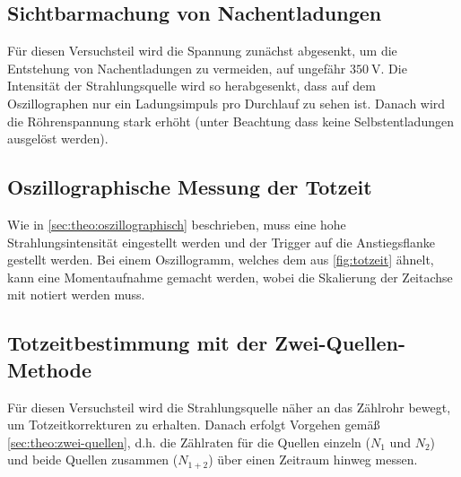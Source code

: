 \subsection{Sichtbarmachung von Nachentladungen}
\label{sec:duch:nachentladungen}

Für diesen Versuchsteil wird die Spannung zunächst abgesenkt, um die Entstehung von Nachentladungen zu vermeiden,
auf ungefähr $\SI{350}{\volt}$. Die Intensität der Strahlungsquelle wird so herabgesenkt, dass auf dem Oszillographen 
nur ein Ladungsimpuls pro Durchlauf zu sehen ist. Danach wird die Röhrenspannung stark erhöht (unter Beachtung dass
keine Selbstentladungen ausgelöst werden).

\subsection{Oszillographische Messung der Totzeit}
\label{sec:durch:oszill-totzeit}

Wie in \autoref{sec:theo:oszillographisch} beschrieben, muss eine hohe Strahlungsintensität eingestellt werden und der
Trigger auf die Anstiegsflanke gestellt werden. Bei einem Oszillogramm, welches dem aus \autoref{fig:totzeit} ähnelt,
kann eine Momentaufnahme gemacht werden, wobei die Skalierung der Zeitachse mit notiert werden muss.

\subsection{Totzeitbestimmung mit der Zwei-Quellen-Methode}
\label{sec:durch:zwei-quellen}

Für diesen Versuchsteil wird die Strahlungsquelle näher an das Zählrohr bewegt, um Totzeitkorrekturen zu erhalten. Danach
erfolgt Vorgehen gemäß \autoref{sec:theo:zwei-quellen}, d.h. die Zählraten für die Quellen einzeln ($N_1$ und $N_2$)
und beide Quellen zusammen ($N_{1+2}$) über einen Zeitraum hinweg messen.
